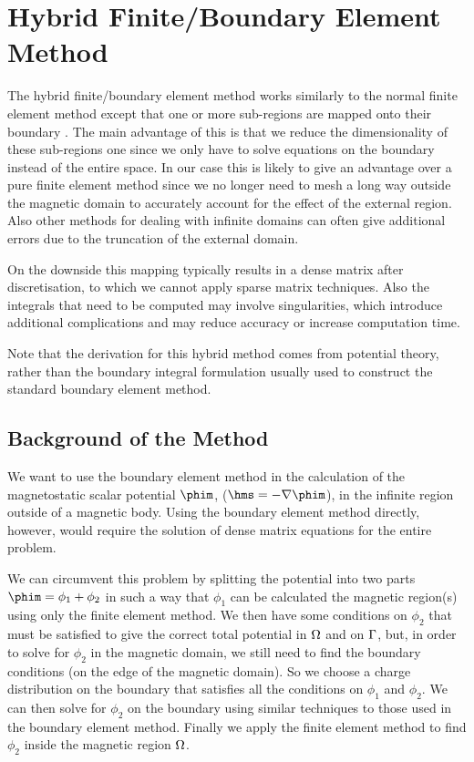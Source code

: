 
\section{Hybrid Finite/Boundary Element Method}
\label{sec:hybr-finit-elem}
The hybrid finite/boundary element method works similarly to the normal finite element method except that one or more sub-regions are mapped onto their boundary \cite{Rammohan2002}.
The main advantage of this is that we reduce the dimensionality of these sub-regions one since we only have to solve equations on the boundary instead of the entire space.
In our case this is likely to give an advantage over a pure finite element method since we no longer need to mesh a long way outside the magnetic domain to accurately account for the effect of the external region. Also other methods for dealing with infinite domains can often give additional errors due to the truncation of the external domain.\cite{Bottauscio2008}

On the downside this mapping typically results in a dense matrix after discretisation, to which we cannot apply sparse matrix techniques.
Also the integrals that need to be computed may involve singularities, which introduce additional complications and may reduce accuracy or increase computation time.

Note that the derivation for this hybrid method comes from potential theory, rather than the boundary integral formulation usually used to construct the standard boundary element method.

\subsection{Background of the Method}
\label{sec:basic-method}
We want to use the boundary element method in the calculation of the magnetostatic scalar potential $\phim$, ($\hms = - \nabla \phim$), in the infinite region outside of a magnetic body.
Using the boundary element method directly, however, would require the solution of dense matrix equations for the entire problem.

We can circumvent this problem by splitting the potential into two parts $\phim = \phi_1 + \phi_2$ in such a way that $\phi_1$ can be calculated the magnetic region(s) using only the finite element method.
We then have some conditions on $\phi_2$ that must be satisfied to give the correct total potential in $\Omega$ and on ${\Gamma}$, but, in order to solve for $\phi_2$ in the magnetic domain, we still need to find the boundary conditions (on the edge of the magnetic domain).
So we choose a charge distribution on the boundary that satisfies all the conditions on $\phi_1$ and $\phi_2$.
We can then solve for $\phi_2$ on the boundary using similar techniques to those used in the boundary element method.
Finally we apply the finite element method to find $\phi_2$ inside the magnetic region $\Omega$.

